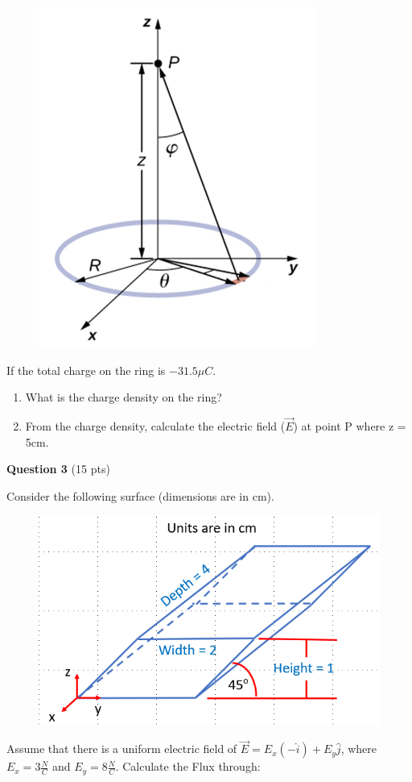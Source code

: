 \documentclass[14pt]{report}
\begin{document}
\begin{figure}[H]
\begin{center}
\includegraphics[scale=0.40]{exam1_2.png}
\end{center}
\end{figure}

If the total charge on the ring is $-31.5 \mu C$. 

\begin{enumerate}[label=\Alph*]
\item What is the charge density on the ring?
\item From the charge density, calculate the electric field ($\vec{E}$) at point P where z = 5cm.
\end{enumerate}

\newpage
\textbf{Question 3} (15 pts)

Consider the following surface (dimensions are in cm). 

\begin{figure}[H]
\begin{center}
\includegraphics[scale=0.40]{exam1_4.png}
\end{center}
\end{figure}
Assume that there is a uniform electric field of $\vec{E} = E_x (-\hat{i}) + E_y \hat{j}$, where $E_x = 3 \frac{N}{C} $ and $E_y = 8 \frac{N}{C}$. Calculate the Flux through:
\end{document}
